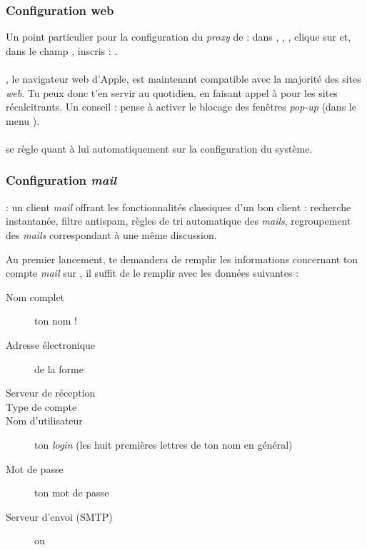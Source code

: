 \subsubsection{Configuration web}
Un point particulier pour la configuration du \emph{proxy} de  : dans , , , clique sur  et, dans le champ , inscris : . 
\\
\\

, le navigateur web d'Apple, est maintenant compatible avec la majorit\'e des sites \emph{web}. Tu peux donc t'en servir au quotidien, en faisant appel \`a   pour les sites r\'ecalcitrants. Un conseil : pense \`a  activer le blocage des fen\^etres \emph{pop-up} (dans le menu ). \\
\\

 se règle quant à lui automatiquement sur la configuration du système. 
\\

\subsubsection{Configuration \emph{mail}}
  : un client \emph{mail} offrant les fonctionnalit\'es classiques d'un bon client : recherche instantan\'ee, filtre antispam, r\`egles de tri automatique des \emph{mails}, regroupement des \emph{mails} correspondant \`a  une m\^eme discussion.

Au premier lancement,  te demandera de remplir les informations concernant ton compte \emph{mail} sur , il suffit de le remplir avec les donn\'ees suivantes :
\begin{description}
  \item[Nom complet] ton nom !
  \item[Adresse \'electronique] de la forme 
  \item[Serveur de r\'eception] 
  \item[Type de compte] 
  \item[Nom d'utilisateur] ton \emph{login}  (les huit premi\`eres lettres de ton nom en g\'en\'eral)
  \item[Mot de passe] ton mot de passe 
  \item[Serveur d'envoi (SMTP)]  ou 
\end{description}

